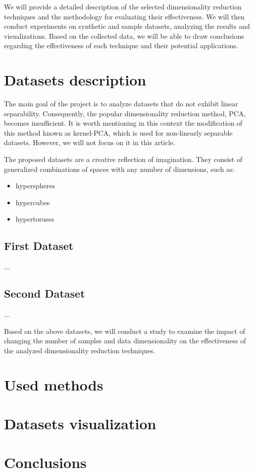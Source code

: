 \documentclass{article}
\begin{document}
    We will provide a detailed description of the selected dimensionality reduction techniques and the methodology for evaluating their effectiveness. We will then conduct experiments on synthetic and sample datasets, analyzing the results and visualizations. Based on the collected data, we will be able to draw conclusions regarding the effectiveness of each technique and their potential applications.
    

\newpage
\section{Datasets description}
    The main goal of the project is to analyze datasets that do not exhibit linear separability. Consequently, the popular dimensionality reduction method, PCA, becomes insufficient. It is worth mentioning in this context the modification of this method known as kernel-PCA, which is used for non-linearly separable datasets. However, we will not focus on it in this article.
    
    The proposed datasets are a creative reflection of imagination. They consist of generalized combinations of spaces with any number of dimensions, such as:
    \begin{itemize}
        \item hyperspheres
        \item hypercubes
        \item hypertoruses
    \end{itemize}

    \subsection{First Dataset}
        ...
    \subsection{Second Dataset}
        ...
    
    Based on the above datasets, we will conduct a study to examine the impact of changing the number of samples and data dimensionality on the effectiveness of the analyzed dimensionality reduction techniques.

\newpage
\section{Used methods}

\newpage
\section{Datasets visualization}

\newpage
\section{Conclusions}
\end{document}
